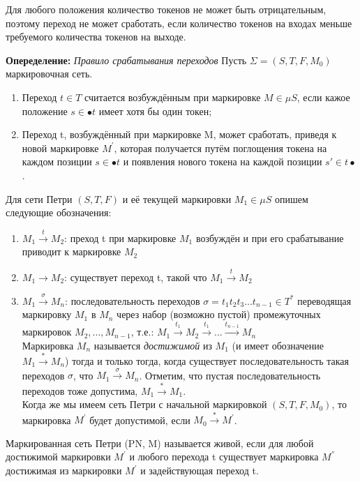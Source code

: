 \documentclass[a4paper,14pt]{article}
\newenvironment{definition}[1]{\begin{trivlist}
\item[\hskip \labelsep {\bfseries #1}]}{\end{trivlist}}
\begin{document}
Для любого положения количество токенов не может быть отрицательным, поэтому переход не может сработать, если количество токенов на входах меньше требуемого количества токенов на выходе. 

\textbf{Опеределение: } \textit{Правило срабатывания переходов}
Пусть $\Sigma = (S,T,F, M_{0})$ маркировочная сеть.
\begin{enumerate}
\item Переход $t \in T$ считается возбуждённым при маркировке $M \in \mu S$, если кажое положение $s \in \bullet t$ имеет хотя бы один токен;
\item Переход t, возбуждённый при маркировке M,  может сработать, приведя к новой маркировке $M^{'}$,  которая  получается путём поглощения токена на каждом позиции $s \in \bullet t$ и появления нового токена на каждой позиции $s' \in t \bullet$.
\end{enumerate}

Для сети Петри $(S,T,F)$ и её текущей маркировки $M_{1} \in \mu S$ опишем следующие обозначения: 
\begin{enumerate}
	\item[-] $M_{1} \xrightarrow{t} M_{2}$: преход t при 	маркировке $M_{1}$ возбуждён и при его срабатывание приводит к маркировке $M_{2}$
	\item[-] $M_{1} \xrightarrow{} M_{2}$: существует переход t, такой что $M_{1} \xrightarrow{t} M_{2}$
	\item[-]  $M_{1} \xrightarrow{\sigma} M_{n}$: последовательность переходов $\sigma = t_{1}t_{2}t_{3}...t_{n-1} \in T^{*}$ переводящая маркировку $M_{1}$ в $M_{n}$ через набор (возможно пустой) промежуточных маркировок $M_{2},...,M_{n-1}$, т.е.:
	 $M_{1} \xrightarrow{t_{1}} M_{2} \xrightarrow{t_{1}} ... \xrightarrow{t_{n-1}} M_{n}$ \\
Маркировка $M_{n}$ называется \textit{достижимой} из $M_{1}$ (и имеет обозначение $M_{1} \xrightarrow{*} M_{n}$) тогда и только тогда, когда существует последовательность такая переходов $\sigma$, что $M_{1} \xrightarrow{\sigma} M_{n}$. Отметим, что пустая последовательность переходов тоже допустима, $M_{1} \xrightarrow{*} M_{1}$.\\
Когда же мы имеем сеть Петри с начальной маркировкой $(S,T,F, M_{0})$, то маркировка $M^{'}$ будет допустимой, если $M_{0} \xrightarrow{*} M^{'}$.
\end{enumerate}

\begin{definition}{Определение: Живость(Live)}
Маркированная сеть Петри (PN, M) называется живой,
 если для любой достижимой маркировки  $M^{'}$  и любого перехода t существует маркировка $M^{''}$ достижимая из маркировки $M^{'}$ и задействующая переход t.
\end{definition}
\end{document}
